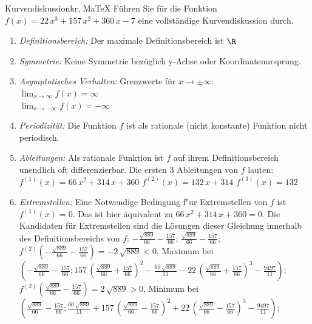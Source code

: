  \providecommand{\MoIl}{(} 
 \providecommand{\MoIr}{)}
 \providecommand{\MIntvlSep}{;} 
 \providecommand{\MElSetSep}{;} 
 \begin{MAufgabe}{Kurvendiskussion}{kr, MaTeX}
 F\"uhren Sie f\"ur die Funktion $f(x)=22\, x^3 + 157\, x^2 + 360\, x - 7$ eine vollst\"andige Kurvendiskussion durch.\\ 
 \ifLsg\Loesung
 \begin{enumerate}
 \item \emph{Definitionsbereich:} 
 Der maximale Definitionsbereich ist $\R$\item \emph{Symmetrie:} 
 Keine Symmetrie bez\"uglich y-Achse oder Koordinatenursprung.\item \emph{Asymptotisches Verhalten:} 
 Grenzwerte f\"ur $x\rightarrow \pm \infty$: \\ 
 $\lim_{x\rightarrow \infty} f(x)=\infty$ \\ 
 $\lim_{x\rightarrow -\infty} f(x)=- \infty$ \\ 
 \item \emph{Periodizit\"at:} 
 Die Funktion $f$ ist als rationale (nicht konstante) Funktion nicht periodisch.\item \emph{Ableitungen:} 
 Als rationale Funktion ist $f$ auf ihrem Definitionsbereich unendlich oft differenzierbar. 
 Die ersten 3 Ableitungen von $f$ lauten: \\ 
 $f^{(1)}(x)=66\, x^2 + 314\, x + 360$\newline 
  $f^{(2)}(x)=132\, x + 314$\newline 
  $f^{(3)}(x)=132$\newline 
  \item \emph{Extremstellen:} 
 Eine Notwendige Bedingung f"ur Extremstellen von $f$ ist $f^{(1)}(x)=0$. 
 Das ist hier \"aquivalent zu $66\, x^2 + 314\, x + 360=0$. 
 Die Kandidaten f\"ur Extremstellen sind die L\"osungen dieser Gleichung innerhalb des Definitionsbereichs von $f$: $ - \frac{\sqrt{889}}{66} - \frac{157}{66}$; $\frac{\sqrt{889}}{66} - \frac{157}{66}$; \\ 
 $f^{(2)}( - \frac{\sqrt{889}}{66} - \frac{157}{66})=- 2\, \sqrt{889}$$<0$, Maximum bei $( - \frac{\sqrt{889}}{66} - \frac{157}{66};157\, {\left(\frac{\sqrt{889}}{66} + \frac{157}{66}\right)}^2 - \frac{60\, \sqrt{889}}{11} - 22\, {\left(\frac{\sqrt{889}}{66} + \frac{157}{66}\right)}^3 - \frac{9497}{11})$; \\ 
 $f^{(2)}(\frac{\sqrt{889}}{66} - \frac{157}{66})=2\, \sqrt{889}$$>0$, Minimum bei $(\frac{\sqrt{889}}{66} - \frac{157}{66};\frac{60\, \sqrt{889}}{11} + 157\, {\left(\frac{\sqrt{889}}{66} - \frac{157}{66}\right)}^2 + 22\, {\left(\frac{\sqrt{889}}{66} - \frac{157}{66}\right)}^3 - \frac{9497}{11})$; \\ 

\end{enumerate}
\end{MAufgabe}
